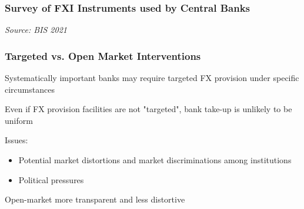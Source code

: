 \documentclass{beamer}
\newenvironment{wideitemize}{\itemize\addtolength{\itemsep}{10pt}}{\enditemize}
\begin{document}
\begin{frame}
\frametitle{Survey of FXI Instruments used by Central Banks}
\medskip
\emph{Source: BIS 2021 \href{https://www.bis.org/publ/bppdf/bispap104b_rh.pdf)}{}}
\end{frame}



\begin{frame}
  \frametitle{Targeted vs. Open Market Interventions}
  \begin{wideitemize}
    \item Systematically important banks may require targeted FX provision under specific circumstances
    \item Even if FX provision facilities are not "targeted", bank take-up is unlikely to be uniform
    \item Issues:
      \begin{itemize}
      \item Potential market distortions and market discriminations among institutions
      \item Political pressures
      \end{itemize}
  \item Open-market more transparent and less distortive
  \end{wideitemize}
\end{frame}
\end{document}
